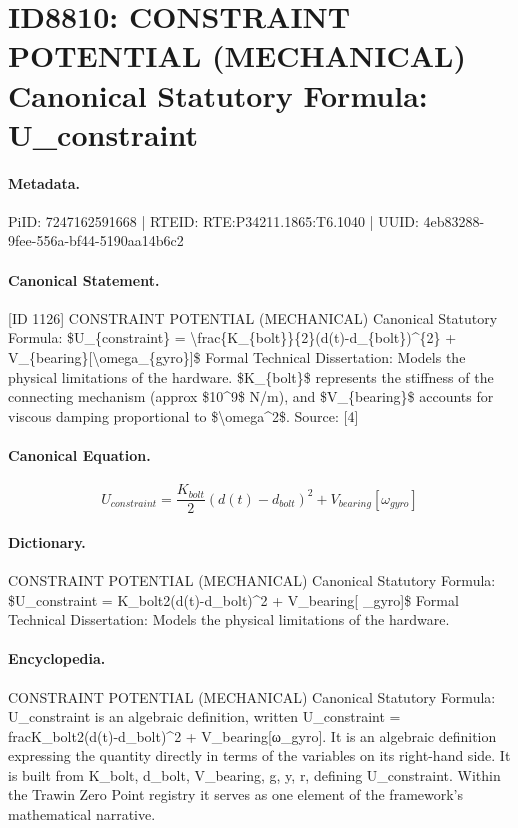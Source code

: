 \section*{ID8810: CONSTRAINT POTENTIAL (MECHANICAL) Canonical Statutory Formula: U\_constraint}
\paragraph{Metadata.}
PiID: 7247162591668 | RTEID: RTE:P34211.1865:T6.1040 | UUID: 4eb83288-9fee-556a-bf44-5190aa14b6c2

\paragraph{Canonical Statement.}
[ID 1126] CONSTRAINT POTENTIAL (MECHANICAL) Canonical Statutory Formula: \$U\_\{constraint\} = \textbackslash{}frac\{K\_\{bolt\}\}\{2\}(d(t)-d\_\{bolt\})\textasciicircum{}\{2\} + V\_\{bearing\}[\textbackslash{}omega\_\{gyro\}]\$ Formal Technical Dissertation: Models the physical limitations of the hardware. \$K\_\{bolt\}\$ represents the stiffness of the connecting mechanism (approx \$10\textasciicircum{}9\$ N/m), and \$V\_\{bearing\}\$ accounts for viscous damping proportional to \$\textbackslash{}omega\textasciicircum{}2\$. Source: [4]

\paragraph{Canonical Equation.}
\[
U_{constraint} = \frac{K_{bolt}}{2}(d(t)-d_{bolt})^{2} + V_{bearing}[\omega_{gyro}]
\]

\paragraph{Dictionary.}
CONSTRAINT POTENTIAL (MECHANICAL) Canonical Statutory Formula: \$U\_constraint = K\_bolt2(d(t)-d\_bolt)\textasciicircum{}2 + V\_bearing[ \_gyro]\$ Formal Technical Dissertation: Models the physical limitations of the hardware.

\paragraph{Encyclopedia.}
CONSTRAINT POTENTIAL (MECHANICAL) Canonical Statutory Formula: U\_constraint is an algebraic definition, written U\_constraint = fracK\_bolt2(d(t)-d\_bolt)\textasciicircum{}2 + V\_bearing[ω\_gyro]. It is an algebraic definition expressing the quantity directly in terms of the variables on its right-hand side. It is built from K\_bolt, d\_bolt, V\_bearing, g, y, r, defining U\_constraint. Within the Trawin Zero Point registry it serves as one element of the framework's mathematical narrative.
